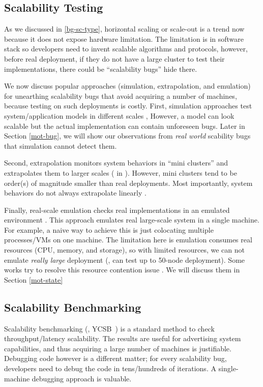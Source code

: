 \subsection{Scalability Testing}

As we discussed in \ref{bg-sc-type}, horizontal scaling or scale-out is a trend
now because it does not expose hardware limitation. The limitation is in
software stack so developers need to invent scalable algorithms and protocols,
however, before real deployment, if they do not have a large cluster to test
their implementations, there could be ``scalability bugs'' hide there.

We now discuss popular approaches (simulation, extrapolation, and emulation) for
unearthing scalability bugs that avoid acquiring a number of machines, because
testing on such deployments is costly.
First, simulation approaches test system/application models in different scales
\cite{Calotoiu+13-ApmScaleBug, Laguna+15-DebugAtScale}, However, a model can
look scalable but the actual implementation can contain unforeseen bugs. Later
in Section \ref{mot-bug}, we will show our observations from \textit{real world}
scability bugs that simulation cannot detect them.

Second, extrapolation monitors system behaviors in ``mini clusters'' and
extrapolates them to larger scales ( in \cite{Wang+14-Exalt}). However,
mini clusters tend to be order(s) of magnitude smaller than real deployments.
Most importantly, system behaviors do not always extrapolate linearly
\cite{Wang+14-Exalt}. 

Finally, real-scale emulation checks real implementations in an emulated
environment \cite{Gupta+08-DieCast, Wang+14-Exalt}. This approach emulates real
large-scale system in a single machine. For example, a naive way to achieve this
is just colocating multiple processes/VMs on one machine. The limitation here is
emulation consumes real resources (CPU, memory, and storage), so with limited
resources, we can not emulate \textit{really large} deployment (\eg, can test up
to 50-node deployment). Some works try to resolve this resource contention issue
\cite{Gupta+08-DieCast, Wang+14-Exalt}. We will discuss them in Section
\ref{mot-state}

\subsection{Scalability Benchmarking}

Scalability benchmarking (\eg, YCSB~\cite{Cooper+10-YCSB}) is a standard method
to check throughput/latency scalability.  The results are useful for
advertising system capabilities, and thus acquiring a large number of machines
is justifiable.  Debugging code however is a different matter; for every
scalability bug, developers need to debug the code in tens/hundreds of
iterations.  A single-machine debugging approach is valuable.
